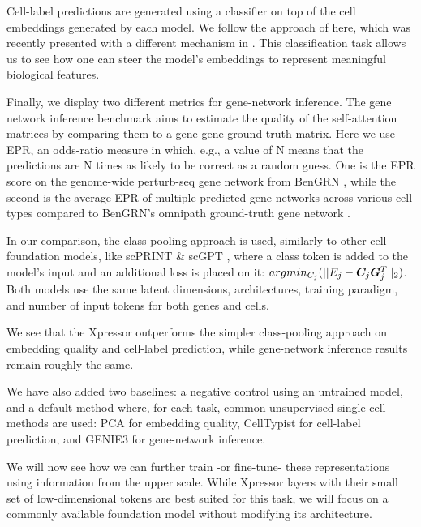 Cell-label predictions are generated using a classifier on top of the cell embeddings generated by each model. We follow the approach of \citet{scprint} here, which was recently presented with a different mechanism in \citet{wangHierarchicalInterpretationOutofDistribution2024}. This classification task allows us to see how one can steer the model's embeddings to represent meaningful biological features.

Finally, we display two different metrics for gene-network inference. The gene network inference benchmark aims to estimate the quality of the self-attention matrices by comparing them to a gene-gene ground-truth matrix. Here we use \gls{EPR}, an odds-ratio measure in which, e.g., a value of N means that the predictions are N times as likely to be correct as a random guess. One is the \gls{EPR} score on the genome-wide perturb-seq gene network from BenGRN \citep{scprint}, while the second is the average \gls{EPR} of multiple predicted gene networks across various cell types compared to BenGRN's omnipath ground-truth gene network \citep{tureiOmniPathGuidelinesGateway2016}.

In our comparison, the class-pooling  approach is used, similarly to other cell foundation models, like scPRINT \& scGPT \citep{cuiScGPTBuildingFoundation2024,scprint}, where a class token is added to the model's input and an additional loss is placed on it: $argmin_{C_j}(||E_j - {\bm{C}}_j {\bm{G}}_j^T||_2)$. Both models use the same latent dimensions, architectures, training paradigm, and number of input tokens for both genes and cells.

We see that the Xpressor outperforms the simpler class-pooling approach on embedding quality and cell-label prediction, while gene-network inference results remain roughly the same.

We have also added two baselines: a negative control using an untrained model, and a default method where, for each task, common unsupervised single-cell methods are used: \gls{PCA} for embedding quality, CellTypist \citep{dominguezcondeCrosstissueImmuneCell2022} for cell-label prediction, and GENIE3 \citep{genie3} for gene-network inference.

We will now see how we can further train -or fine-tune- these representations using information from the upper scale. While Xpressor layers with their small set of low-dimensional tokens are best suited for this task, we will focus on a commonly available foundation model without modifying its architecture.

